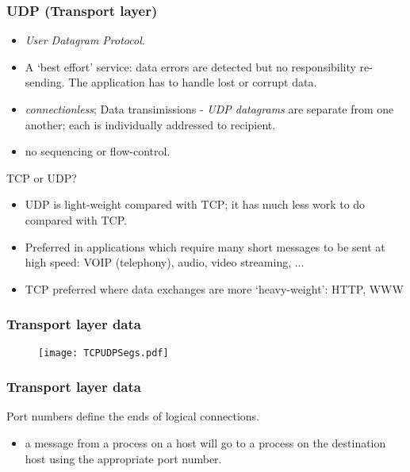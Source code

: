 \documentclass[10pt, hyperref={pdfpagelabels=false}]{beamer}
\begin{document}
\begin{frame}
\frametitle{UDP (Transport layer)}
\begin{itemize}
\item \emph{\color{blue}User Datagram Protocol}.
\item A `best effort' service: data errors are detected but no responsibility re-sending. The application has to handle lost or corrupt data.
\item \emph{\color{blue}connectionless}; Data transimissions - \emph{\color{blue}UDP datagrams} are separate from one another; each is individually addressed to recipient.
\item no sequencing or flow-control.
\end{itemize}

TCP or UDP?
\begin{itemize}
\item UDP is light-weight compared with TCP; it has much less work to do compared with TCP.
\item Preferred in applications which require many short messages to be sent at high speed: VOIP (telephony), audio, video streaming, ...
\item TCP preferred where data exchanges are more `heavy-weight': HTTP, WWW
\end{itemize}
\end{frame}

\begin{frame}
\frametitle{Transport layer data}
\begin{figure}[!htb]
\begin{center}
\texttt{[image: TCPUDPSegs.pdf]}
\end{center}
\end{figure}
\end{frame}

\begin{frame}
\frametitle{Transport layer data}
Port numbers define the ends of logical connections.
\begin{itemize}
\item a message from a process on a host will go to a process on the destination host using the appropriate port number.
\end{itemize}
\end{frame}
\end{document}
